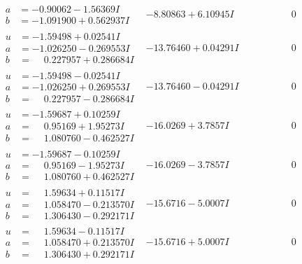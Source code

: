 \documentclass[1p]{elsarticle_modified}
\theoremstyle{definition}
\begin{document}
$$\begin{array}{c|c|c}
\begin{aligned}
a &= -0.90062 - 1.56369 I \\
b &= -1.091900 + 0.562937 I\end{aligned}
 & -8.80863 + 6.10945 I & \phantom{-0.000000 } 0 \\ \hline\begin{aligned}
u &= -1.59498 + 0.02541 I \\
a &= -1.026250 - 0.269553 I \\
b &= \phantom{-}0.227957 + 0.286684 I\end{aligned}
 & -13.76460 + 0.04291 I & \phantom{-0.000000 } 0 \\ \hline\begin{aligned}
u &= -1.59498 - 0.02541 I \\
a &= -1.026250 + 0.269553 I \\
b &= \phantom{-}0.227957 - 0.286684 I\end{aligned}
 & -13.76460 - 0.04291 I & \phantom{-0.000000 } 0 \\ \hline\begin{aligned}
u &= -1.59687 + 0.10259 I \\
a &= \phantom{-}0.95169 + 1.95273 I \\
b &= \phantom{-}1.080760 - 0.462527 I\end{aligned}
 & -16.0269 + 3.7857 I & \phantom{-0.000000 } 0 \\ \hline\begin{aligned}
u &= -1.59687 - 0.10259 I \\
a &= \phantom{-}0.95169 - 1.95273 I \\
b &= \phantom{-}1.080760 + 0.462527 I\end{aligned}
 & -16.0269 - 3.7857 I & \phantom{-0.000000 } 0 \\ \hline\begin{aligned}
u &= \phantom{-}1.59634 + 0.11517 I \\
a &= \phantom{-}1.058470 - 0.213570 I \\
b &= \phantom{-}1.306430 - 0.292171 I\end{aligned}
 & -15.6716 - 5.0007 I & \phantom{-0.000000 } 0 \\ \hline\begin{aligned}
u &= \phantom{-}1.59634 - 0.11517 I \\
a &= \phantom{-}1.058470 + 0.213570 I \\
b &= \phantom{-}1.306430 + 0.292171 I\end{aligned}
 & -15.6716 + 5.0007 I & \phantom{-0.000000 } 0 \\ \hline\begin{aligned}

\end{aligned}
\end{array}$$
\end{document}
